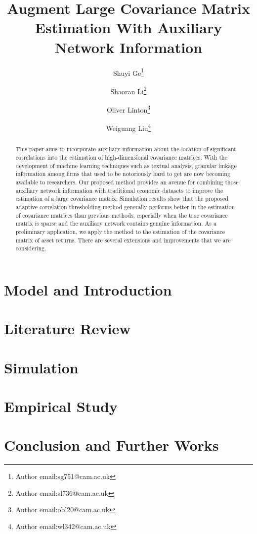 \documentclass[12pt]{article}
\begin{document}
    \title{Augment Large Covariance Matrix Estimation With Auxiliary Network Information}
    \author[]{Shuyi Ge\thanks{Author email:sg751@cam.ac.uk}}
    \author[]{Shaoran Li\thanks{Author email:sl736@cam.ac.uk}}
    \author[]{Oliver Linton\thanks{Author email:obl20@cam.ac.uk}}
    \author[]{Weiguang Liu\thanks{Author email:wl342@cam.ac.uk}}
    \maketitle
    
    \begin{abstract}
        This paper aims to incorporate auxiliary information about the location of significant correlations into the estimation of high-dimensional covariance matrices. With the development of machine learning techniques such as textual analysis, granular linkage information among firms that used to be notoriously hard to get are now becoming available to researchers. Our proposed method provides an avenue for combining those auxiliary network information with traditional economic datasets to improve the estimation of a large covariance matrix. Simulation results show that the proposed adaptive correlation thresholding method generally performs better in the estimation of covariance matrices than previous methods, especially when the true covariance matrix is sparse and the auxiliary network contains genuine information. As a preliminary application, we apply the method to the estimation of the covariance matrix of asset returns. There are several extensions and improvements that we are considering.     
    \end{abstract}
    
    \section{Model and Introduction}
    \section{Literature Review}
    \section{Simulation} 
    \section{Empirical Study}
    \section{Conclusion and Further Works}

\printbibliography
\end{document}
